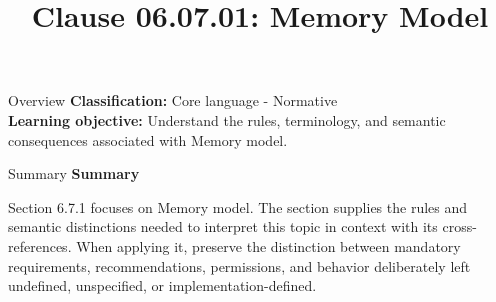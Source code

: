 \documentclass[10pt,letterpaper]{article}
\title{Clause 06.07.01: Memory Model}
\author{}
\date{}
\begin{document}
\maketitle
\begin{CornellOverviewBox}{Overview}
\textbf{Classification:} Core language - Normative\\[2pt]
\textbf{Learning objective:} Understand the rules, terminology, and semantic consequences associated with Memory model.
\end{CornellOverviewBox}\begin{CornellSummaryBox}{Summary}
{\sffamily\bfseries\color{Accent} Summary}\par\vspace{3pt}Section 6.7.1 focuses on Memory model. The section supplies the rules and semantic distinctions needed to interpret this topic in context with its cross-references. When applying it, preserve the distinction between mandatory requirements, recommendations, permissions, and behavior deliberately left undefined, unspecified, or implementation-defined.
\end{CornellSummaryBox}
\end{document}
